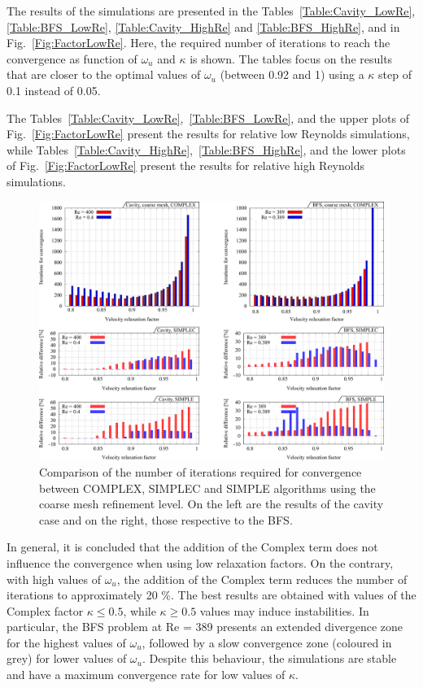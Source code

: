 \documentclass[final,3p,times,11pt,onecolumn]{myElsarticle}
\numberwithin{equation}{section}
\begin{document}
The results of the simulations are presented in the Tables~\ref{Table:Cavity_LowRe}, \ref{Table:BFS_LowRe}, \ref{Table:Cavity_HighRe} and \ref{Table:BFS_HighRe}, and in Fig.~\ref{Fig:FactorLowRe}. Here, the required number of iterations to reach the convergence as function of $\omega_u$ and $\kappa$ is shown. The tables focus on the results that are closer to the optimal values of $\omega_u$ (between 0.92 and 1) using a $\kappa$ step of 0.1 instead of 0.05. 
 
The Tables~\ref{Table:Cavity_LowRe},~\ref{Table:BFS_LowRe}, and the upper plots of Fig.~\ref{Fig:FactorLowRe} present the results for relative low Reynolds simulations, while Tables~\ref{Table:Cavity_HighRe},~\ref{Table:BFS_HighRe}, and the lower plots of Fig.~\ref{Fig:FactorLowRe} present the results for relative high Reynolds simulations.

\begin{figure}[b!]
\centering
\includegraphics[width=15cm]{fig/Results/complexCoarse.pdf}
\caption{Comparison of the number of iterations required for convergence between COMPLEX, SIMPLEC and SIMPLE algorithms using the coarse mesh refinement level. On the left are the results of the cavity case and on the right, those respective to the BFS.}
\label{Fig:complexCoarse}
\end{figure}

In general, it is concluded that the addition of the Complex term does not influence the convergence when using low relaxation factors. On the contrary, with high values of $\omega_u$, the addition of the Complex term reduces the number of iterations to approximately 20 $\%$. The best results are obtained with values of the Complex factor $\kappa \leq 0.5$, while $\kappa \geq 0.5$ values may induce instabilities. In particular, the BFS problem at Re = 389 presents an extended divergence zone for the highest values of $\omega_u$, followed by a slow convergence zone (coloured in grey) for lower values of $\omega_u$. Despite this behaviour, the simulations are stable and have a maximum convergence rate for low values of $\kappa$.
\end{document}
